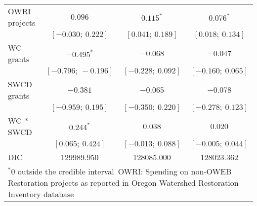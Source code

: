 \begin{table}
\begin{center}
\begin{tabular}{l c c c }
OWRI projects    & $0.096$             & $0.115^{*}$         & $0.076^{*}$         \\
                 & $[-0.030;\ 0.222]$  & $[0.041;\ 0.189]$   & $[0.018;\ 0.134]$   \\
WC grants        & $-0.495^{*}$        & $-0.068$            & $-0.047$            \\
                 & $[-0.796;\ -0.196]$ & $[-0.228;\ 0.092]$  & $[-0.160;\ 0.065]$  \\
SWCD grants      & $-0.381$            & $-0.065$            & $-0.078$            \\
                 & $[-0.959;\ 0.195]$  & $[-0.350;\ 0.220]$  & $[-0.278;\ 0.123]$  \\
WC * SWCD        & $0.244^{*}$         & $0.038$             & $0.020$             \\
                 & $[0.065;\ 0.424]$   & $[-0.013;\ 0.088]$  & $[-0.005;\ 0.044]$  \\
\hline
DIC              & 129989.950          & 128085.000          & 128023.362          \\
\hline
\multicolumn{4}{l}{\scriptsize{$^* 0$ outside the credible interval\
       OWRI: Spending on non-OWEB Restoration projects as reported in Oregon Watershed Restoration Inventory database}}
\end{tabular}
\label{table:basemods}
\end{center}
\end{table}
